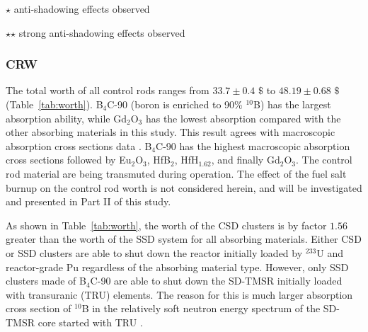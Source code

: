 \begin{sidewaystable}
	\begin{tablenotes}
		\tiny
		\item  $\star$  anti-shadowing effects observed
		\item  $\star$$\star$ strong anti-shadowing effects observed
	\end{tablenotes}
	\label{tab:worth}
\end{sidewaystable}

\subsubsection{CRW} \label{CR_worth}

The total worth of all control rods ranges from $33.7\pm0.4$ $\$$ to $48.19\pm0.68$ 
$\$$ (Table~\ref{tab:worth}). B$_4$C-90 (boron is enriched to 90\% $^{10}$B) 
has the largest absorption ability, while Gd$_2$O$_3$ has the lowest 
absorption compared with the other absorbing materials in this study. This 
result agrees with macroscopic absorption cross sections data 
\cite{guo2019optimized}. B$_4$C-90 has the highest macroscopic 
absorption cross sections followed by Eu$_2$O$_3$, HfB$_2$, HfH$_{1.62}$, and 
finally Gd$_2$O$_3$. The control rod material are being transmuted during 
operation. The effect of the fuel salt burnup on the control rod worth is not 
considered herein, and will be investigated and presented in Part II of this 
study.

As shown in Table~\ref{tab:worth}, the worth of the CSD clusters is by factor $1.56$ greater than 
the worth of the SSD system for all absorbing materials. Either CSD or SSD 
clusters are able to shut down the reactor initially loaded by 
$^{233}$U and reactor-grade Pu regardless of the absorbing material type. 
However, only SSD clusters made of B$_4$C-90 are able to shut down the SD-TMSR 
initially loaded with transuranic (TRU) elements. The reason for this is much larger 
absorption cross section of $^{10}$B in the relatively soft neutron energy 
spectrum of the SD-TMSR core started with TRU \cite{ashraf2020Strategies}.


